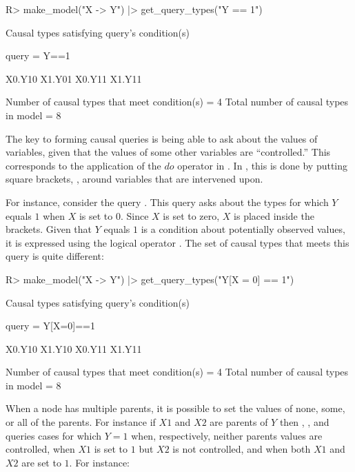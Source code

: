 \documentclass[
  11pt,
  article]{jss}
\renewcommand{\texttt}[1]{\code{#1}}
\begin{document}
\begin{CodeChunk}
\begin{CodeInput}
R> make_model("X -> Y")  |> get_query_types("Y == 1")
\end{CodeInput}

\begin{CodeOutput}

Causal types satisfying query's condition(s)

 query =  Y==1

X0.Y10  X1.Y01
X0.Y11  X1.Y11


 Number of causal types that meet condition(s) =  4
 Total number of causal types in model =  8
\end{CodeOutput}
\end{CodeChunk}

The key to forming causal queries is being able to ask about the values
of variables, given that the values of some other variables are
``controlled.'' This corresponds to the application of the \(do\)
operator in \citet{pearl_causality_2009}. In , this
is done by putting square brackets, \texttt{{[}\ {]}}, around variables
that are intervened upon.

For instance, consider the query \texttt{Y{[}X\ =\ 0{]}\ ==\ 1}. This
query asks about the types for which \(Y\) equals \(1\) when \(X\) is
set to \(0\). Since \(X\) is set to zero, \(X\) is placed inside the
brackets. Given that \(Y\) equals \(1\) is a condition about potentially
observed values, it is expressed using the logical operator \texttt{==}.
The set of causal types that meets this query is quite different:

\begin{CodeChunk}
\begin{CodeInput}
R> make_model("X -> Y") |> get_query_types("Y[X = 0] == 1")
\end{CodeInput}

\begin{CodeOutput}

Causal types satisfying query's condition(s)

 query =  Y[X=0]==1

X0.Y10  X1.Y10
X0.Y11  X1.Y11


 Number of causal types that meet condition(s) =  4
 Total number of causal types in model =  8
\end{CodeOutput}
\end{CodeChunk}

When a node has multiple parents, it is possible to set the values of
none, some, or all of the parents. For instance if \(X1\) and \(X2\) are
parents of \(Y\) then \texttt{Y\ ==\ 1},
\texttt{Y{[}X1\ =\ 1{]}\ ==\ 1}, and
\texttt{Y{[}X1\ =\ 1,\ X2\ =\ 1{]}\ ==\ 1} queries cases for which
\(Y=1\) when, respectively, neither parents values are controlled, when
\(X1\) is set to \(1\) but \(X2\) is not controlled, and when both
\(X1\) and \(X2\) are set to \(1\). For instance:
\end{document}
